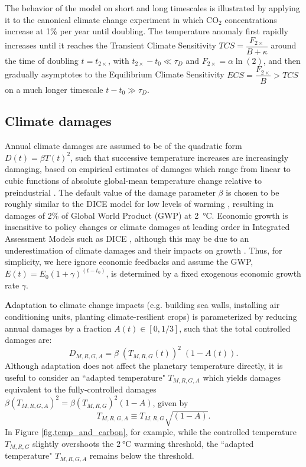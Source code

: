 \documentclass{article}
\begin{document}
The behavior of the model on short and long timescales is illustrated by applying it to the canonical climate change experiment in which CO$_{2}$ concentrations increase at 1\% per year until doubling. The temperature anomaly first rapidly increases until it reaches the Transient Climate Sensitivity $TCS = \dfrac{F_{2\times}}{B + \kappa}$ around the time of doubling $t=t_{2\times}$, with $t_{2\times} - t_{0} \ll \tau_{D}$ and $F_{2\times} = \alpha \ln(2)$, and then gradually asymptotes to the Equilibrium Climate Sensitivity $ECS = \dfrac{F_{2\times}}{B} > TCS$ on a much longer timescale $t-t_{0} \gg \tau_{D}$.

\subsection{Climate damages}

Annual climate damages are assumed to be of the quadratic form $D(t) = \beta T(t)^{2}$, such that successive temperature increases are increasingly damaging, based on empirical estimates of damages which range from linear to cubic functions of absolute global-mean temperature change relative to preindustrial \citep{stern_economics_2007}. The default value of the damage parameter $\beta$ is chosen to be roughly similar to the DICE model for low levels of warming \citep{nordhaus2013dice}, resulting in damages of 2\% of Global World Product (GWP) at \SI{2}{\celsius}. Economic growth is insensitive to policy changes or climate damages at leading order in Integrated Assessment Models such as DICE \citep[see Figure 3 of][]{nordhaus2013dice}, although this may be due to an underestimation of climate damages and their impacts on growth \citep{burke_global_2015, glanemann_paris_2020}. Thus, for simplicity, we here ignore economic feedbacks and assume the GWP, $E(t) = E_{0}(1 + \gamma)^{(t-t_{0})}$, is determined by a fixed exogenous economic growth rate $\gamma$.

\textbf{A}daptation to climate change impacts (e.g. building sea walls, installing air conditioning units, planting climate-resilient crops) is parameterized by reducing annual damages by a fraction $A(t) \in [0, 1/3]$, such that the total controlled damages are:
\begin{equation}
    D_{M, R, G, A} = \beta \; (T_{M, R, G}(t))^{2} \; (1-A(t)).
\end{equation}
Although adaptation does not affect the planetary temperature directly, it is useful to consider an ``adapted temperature" $T_{M,R,G,A}$ which yields damages equivalent to the fully-controlled damages $\beta (T_{M,R,G,A})^{2} = \beta (T_{M,R,G})^{2} (1-A)$, given by
\begin{equation}
    T_{M,R,G,A} \equiv T_{M,R,G} \sqrt{(1-A)}.\label{eq.adapted_temperature}
\end{equation}
In Figure \ref{fig.temp_and_carbon}, for example, while the controlled temperature $T_{M,R,G}$ slightly overshoots the $\SI{2}{\celsius}$ warming threshold, the ``adapted temperature" $T_{M,R,G,A}$ remains below the threshold.
\end{document}
